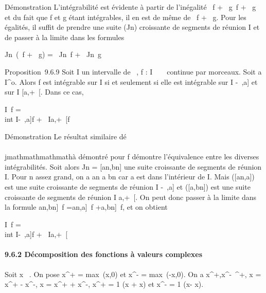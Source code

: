Démonstration L'intégrabilité est évidente à partir de l'inégalité
\textbar{}\alpha~f + \beta~g\textbar{}\leq\textbar{}\alpha~\textbar{}\textbar{}f\textbar{} +
\textbar{}\beta~\textbar{}\textbar{}g\textbar{} et du fait que
\textbar{}f\textbar{} et \textbar{}g\textbar{} étant intégrables, il en
est de même de \textbar{}\alpha~\textbar{}\textbar{}f\textbar{} +
\textbar{}\beta~\textbar{}\textbar{}g\textbar{}. Pour les égalités, il suffit
de prendre une suite (Jn) croissante de segments de réunion I
et de passer à la limite dans les formules

\int  Jn~(\alpha~f + \beta~g) =
\alpha~\int  Jn~f +
\beta~\int  Jn~g

Proposition~9.6.9 Soit I un intervalle de ~, f : I \rightarrow~ ~ continue par
morceaux. Soit a \in I^o. Alors f est intégrable sur I si et
seulement si elle est intégrable sur I\bigcap{]} -\infty~,a{]} et sur I \bigcap
{[}a,+\infty~{[}. Dans ce cas,

\int  I~f =\\int
 I\bigcap{]}-\infty~,a{]}f +\int ~
I\bigcap{[}a,+\infty~{[}f

Démonstration Le résultat similaire dé\\\\jmathmathmathmathà démontré pour
\textbar{}f\textbar{} démontre l'équivalence entre les diverses
intégrabilités. Soit alors Jn =
{[}an,bn{]} une suite croissante de segments de
réunion I. Pour n assez grand, on a an \leq a \leq bn car
a est dans l'intérieur de I. Mais ({[}an,a{]}) est une suite
croissante de segments de réunion I\bigcap{]} -\infty~,a{]} et
({[}a,bn{]}) est une suite croissante de segments de réunion I
\bigcap {[}a,+\infty~{[}. On peut donc passer à la limite dans la formule
\int  {[}an,bn{]}~f
=\int  {[}an,a{]}~f
+\int  {[}a,bn{]}~f, et on
obtient

\int  I~f =\\int
 I\bigcap{]}-\infty~,a{]}f +\int ~
I\bigcap{[}a,+\infty~{[}

\paragraph{9.6.2 Décomposition des fonctions à valeurs complexes}

Soit x \in {}~. On pose x^+ = max~(x,0)
et x^- = max~(-x,0). On a
x^+,x^-\in {}~^+, x = x^+ -
x^-, \textbar{}x\textbar{} = x^+ + x^-,
x^+ = 1  (\textbar{}x\textbar{} +
x) et x^- = 1 
(\textbar{}x\textbar{}- x).

